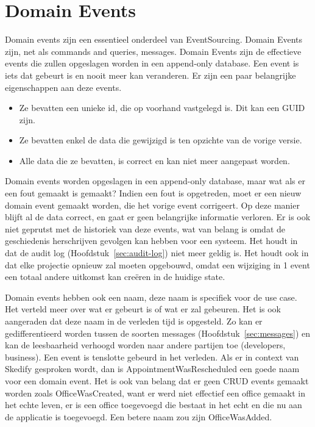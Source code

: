 
\section{Domain Events}
\label{sec:domain-events}

Domain events zijn een essentieel onderdeel van EventSourcing. Domain Events zijn, net als commands and queries, messages. Domain Events zijn de effectieve events die zullen opgeslagen worden in een append-only database. Een event is iets dat gebeurt is en nooit meer kan veranderen. Er zijn een paar belangrijke eigenschappen aan deze events.

\begin{itemize}
  \item{Ze bevatten een unieke id, die op voorhand vastgelegd is. Dit kan een \gls{GUID} zijn.}
  \item{Ze bevatten enkel de data die gewijzigd is ten opzichte van de vorige versie.}
  \item{Alle data die ze bevatten, is correct en kan niet meer aangepast worden.}
\end{itemize}

Domain events worden opgeslagen in een append-only database, maar wat als er een fout gemaakt is gemaakt?
Indien een fout is opgetreden, moet er een nieuw domain event gemaakt worden, die het vorige event corrigeert. Op deze manier blijft al de data correct, en gaat er geen belangrijke informatie verloren. Er is ook niet geprutst met de historiek van deze events, wat van belang is omdat de geschiedenis herschrijven gevolgen kan hebben voor een systeem. Het houdt in dat de audit log (Hoofdstuk~\ref{sec:audit-log}) niet meer geldig is. Het houdt ook in dat elke projectie opnieuw zal moeten opgebouwd, omdat een wijziging in 1 event een totaal andere uitkomst kan creëren in de huidige state.

Domain events hebben ook een naam, deze naam is specifiek voor de use case. Het verteld meer over wat er gebeurt is of wat er zal gebeuren. Het is ook aangeraden dat deze naam in de verleden tijd is opgesteld. Zo kan er gedifferentieerd worden tussen de soorten messages (Hoofdstuk~\ref{sec:messages}) en kan de leesbaarheid verhoogd worden naar andere partijen toe (developers, business). Een event is tenslotte gebeurd in het verleden. Als er in context van Skedify gesproken wordt, dan is AppointmentWasRescheduled een goede naam voor een domain event. Het is ook van belang dat er geen \gls{CRUD} events gemaakt worden zoals OfficeWasCreated, want er werd niet effectief een office gemaakt in het echte leven, er is een office toegevoegd die bestaat in het echt en die nu aan de applicatie is toegevoegd. Een betere naam zou zijn OfficeWasAdded.
